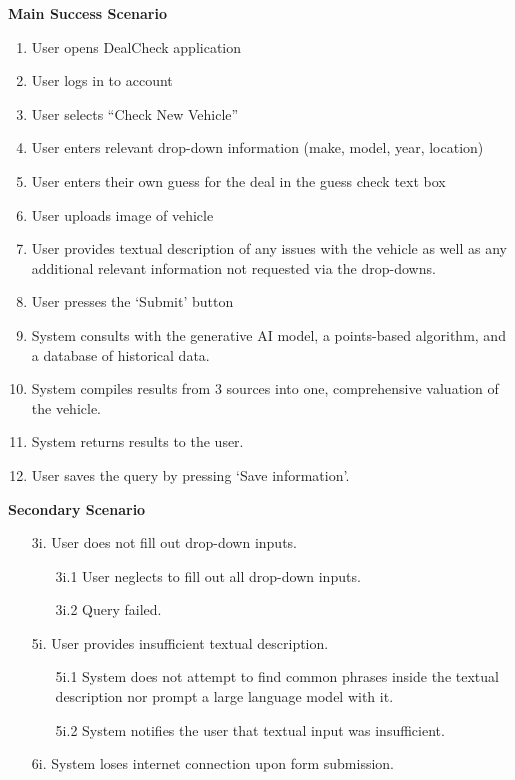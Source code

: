 \documentclass[]{article}
\begin{document}
\begin{enumerate}[{\bf {BE}1.}]
	{\bf Main Success Scenario}
		\begin{enumerate}[1.]
			\item User opens DealCheck application
			\item User logs in to account
			\item User selects “Check New Vehicle”
			\item User enters relevant drop-down information (make, model, year, location)
                \item User enters their own guess for the deal in the guess check text box
			\item User uploads image of vehicle
			\item User provides textual description of any issues with the vehicle as well as any additional relevant information not requested via the drop-downs.
			\item User presses the ‘Submit’ button
			\item System consults with the generative AI model, a points-based algorithm, and a database of historical data.
			\item System compiles results from 3 sources into one, comprehensive valuation of the vehicle.
			\item System returns results to the user.
			\item User saves the query by pressing ‘Save information’.
		\end{enumerate}
		{\bf Secondary Scenario} \\
            \begin{enumerate}
                \item [3i.] User does not fill out drop-down inputs.
    		\begin{enumerate}
    			\item [3i.1] User neglects to fill out all drop-down inputs.
    			\item [3i.2] Query failed.
    		\end{enumerate}
    		\item [5i.] User provides insufficient textual description.
    		\begin{enumerate}
    			\item [5i.1] System does not attempt to find common phrases inside the textual description nor prompt a large language model with it.
    			\item [5i.2] System notifies the user that textual input was insufficient.
    		\end{enumerate}
    		\item [6i.] System loses internet connection upon form submission.

\end{enumerate}
\end{enumerate}
\end{document}
